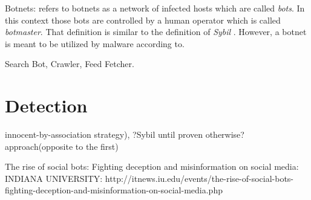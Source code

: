 \documentclass[twoside]{article}
\begin{document}
\begin{multicols}{2}
Botnets:
    \cite{abu:2006} refers to botnets as a network of infected hosts which are called \emph{bots}. In this context those bots are controlled by a human
    operator which is called \emph{botmaster}. That definition is similar to the definition of \emph{Sybil} \cite{ferrara:2015}. However, a botnet
    is meant to be utilized by malware according to\cite{abu:2006}.



Search Bot, Crawler, Feed Fetcher.


\section{Detection}

innocent-by-association strategy), ?Sybil until proven otherwise? approach(opposite to the first)\cite{ferrara:2015}





The rise of social bots: Fighting deception and misinformation on social media: INDIANA UNIVERSITY: http://itnews.iu.edu/events/the-rise-of-social-bots-fighting-deception-and-misinformation-on-social-media.php






\end{multicols}
\end{document}
